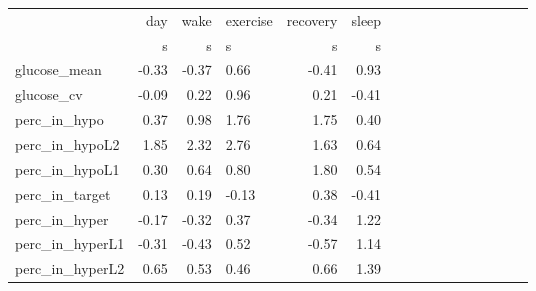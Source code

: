 \begin{tabular}{lrrlrrlrrlrrlrrl}
\toprule
{} &   day &  wake & exercise & recovery & sleep \\
{} &     s &     s &        s &        s &     s \\
\midrule
glucose_mean    & -0.33 & -0.37 &     0.66 &    -0.41 &  0.93 \\
glucose_cv      & -0.09 &  0.22 &     0.96 &     0.21 & -0.41 \\
perc_in_hypo    &  0.37 &  0.98 &     1.76 &     1.75 &  0.40 \\
perc_in_hypoL2  &  1.85 &  2.32 &     2.76 &     1.63 &  0.64 \\
perc_in_hypoL1  &  0.30 &  0.64 &     0.80 &     1.80 &  0.54 \\
perc_in_target  &  0.13 &  0.19 &    -0.13 &     0.38 & -0.41 \\
perc_in_hyper   & -0.17 & -0.32 &     0.37 &    -0.34 &  1.22 \\
perc_in_hyperL1 & -0.31 & -0.43 &     0.52 &    -0.57 &  1.14 \\
perc_in_hyperL2 &  0.65 &  0.53 &     0.46 &     0.66 &  1.39 \\
\bottomrule
\end{tabular}
